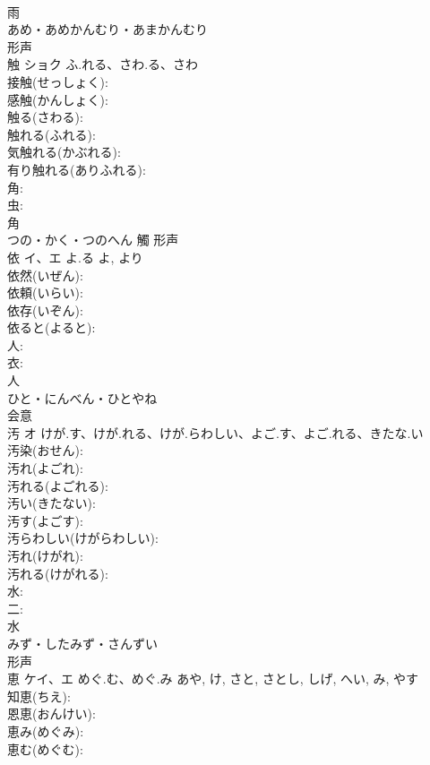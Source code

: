 \documentclass[8pt]{extreport}
\begin{document}
\begin{CJK}{UTF8}{min}
\\	雨	
\\	あめ・あめかんむり・あまかんむり	
\\	形声 
\\	触	ショク	ふ.れる、さわ.る、さわ		
\\	接触(せっしょく): 
\\	感触(かんしょく): 
\\	触る(さわる): 
\\	触れる(ふれる): 
\\	気触れる(かぶれる): 
\\	有り触れる(ありふれる): 
\\	角: 
\\	虫: 
\\	角	
\\	つの・かく・つのへん	觸	形声 
\\	依	イ、エ	よ.る	よ, より	
\\	依然(いぜん): 
\\	依頼(いらい): 
\\	依存(いぞん): 
\\	依ると(よると): 
\\	人: 
\\	衣: 
\\	人	
\\	ひと・にんべん・ひとやね	
\\	会意 
\\	汚	オ	けが.す、けが.れる、けが.らわしい、よご.す、よご.れる、きたな.い		
\\	汚染(おせん): 
\\	汚れ(よごれ): 
\\	汚れる(よごれる): 
\\	汚い(きたない): 
\\	汚す(よごす): 
\\	汚らわしい(けがらわしい): 
\\	汚れ(けがれ): 
\\	汚れる(けがれる): 
\\	水: 
\\	二: 
\\	水	
\\	みず・したみず・さんずい	
\\	形声 
\\	恵	ケイ、エ	めぐ.む、めぐ.み	あや, け, さと, さとし, しげ, へい, み, やす	
\\	知恵(ちえ): 
\\	恩恵(おんけい): 
\\	恵み(めぐみ): 
\\	恵む(めぐむ): 

\end{CJK}
\end{document}
